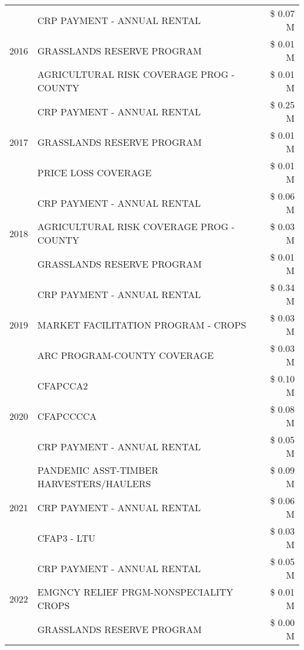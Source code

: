 \begin{tabular}{llr}
\cline{1-3}
\multirow[t]{3}{*}{2016} & CRP PAYMENT - ANNUAL RENTAL & \$ 0.07 M \\
 & GRASSLANDS RESERVE PROGRAM & \$ 0.01 M \\
 & AGRICULTURAL RISK COVERAGE PROG - COUNTY & \$ 0.01 M \\
\cline{1-3}
\multirow[t]{3}{*}{2017} & CRP PAYMENT - ANNUAL RENTAL & \$ 0.25 M \\
 & GRASSLANDS RESERVE PROGRAM & \$ 0.01 M \\
 & PRICE LOSS COVERAGE & \$ 0.01 M \\
\cline{1-3}
\multirow[t]{3}{*}{2018} & CRP PAYMENT - ANNUAL RENTAL & \$ 0.06 M \\
 & AGRICULTURAL RISK COVERAGE PROG - COUNTY & \$ 0.03 M \\
 & GRASSLANDS RESERVE PROGRAM & \$ 0.01 M \\
\cline{1-3}
\multirow[t]{3}{*}{2019} & CRP PAYMENT - ANNUAL RENTAL & \$ 0.34 M \\
 & MARKET FACILITATION PROGRAM - CROPS & \$ 0.03 M \\
 & ARC PROGRAM-COUNTY COVERAGE & \$ 0.03 M \\
\cline{1-3}
\multirow[t]{3}{*}{2020} & CFAPCCA2 & \$ 0.10 M \\
 & CFAPCCCCA & \$ 0.08 M \\
 & CRP PAYMENT - ANNUAL RENTAL & \$ 0.05 M \\
\cline{1-3}
\multirow[t]{3}{*}{2021} & PANDEMIC ASST-TIMBER HARVESTERS/HAULERS & \$ 0.09 M \\
 & CRP PAYMENT - ANNUAL RENTAL & \$ 0.06 M \\
 & CFAP3 - LTU & \$ 0.03 M \\
\cline{1-3}
\multirow[t]{3}{*}{2022} & CRP PAYMENT - ANNUAL RENTAL & \$ 0.05 M \\
 & EMGNCY RELIEF PRGM-NONSPECIALITY CROPS & \$ 0.01 M \\
 & GRASSLANDS RESERVE PROGRAM & \$ 0.00 M \\
\cline{1-3}
\bottomrule
\end{tabular}

